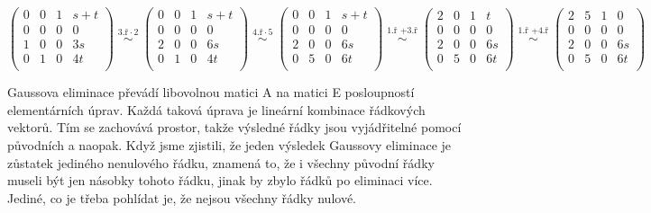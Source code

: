\documentclass[12pt]{article}
\begin{document}
\begin{enumerate}
\begin{enumerate}
    \[
      \left(\begin{array}{ccc|c}
      0 & 0 & 1 & s+t \\
      0 & 0 & 0 & 0 \\ \hline
      1 & 0 & 0 & 3s \\
      0 & 1 & 0 & 4t \\
      \end{array}\right)
      \overset{\text{3.ř} \cdot 2}{\;\sim\;}
      \left(\begin{array}{ccc|c}
      0 & 0 & 1 & s+t \\
      0 & 0 & 0 & 0 \\ \hline
      2 & 0 & 0 & 6s \\
      0 & 1 & 0 & 4t \\
      \end{array}\right)
      \overset{\text{4.ř} \cdot 5}{\;\sim\;}
      \left(\begin{array}{ccc|c}
      0 & 0 & 1 & s+t \\
      0 & 0 & 0 & 0 \\ \hline
      2 & 0 & 0 & 6s \\
      0 & 5 & 0 & 6t \\
      \end{array}\right)
      \overset{\text{1.ř } + \text{3.ř}}{\;\sim\;}
      \left(\begin{array}{ccc|c}
      2 & 0 & 1 & t \\
      0 & 0 & 0 & 0 \\ \hline
      2 & 0 & 0 & 6s \\
      0 & 5 & 0 & 6t \\
      \end{array}\right)
      \overset{\text{1.ř } + \text{4.ř}}{\;\sim\;}
      \left(\begin{array}{ccc|c}
      2 & 5 & 1 & 0 \\
      0 & 0 & 0 & 0 \\ \hline
      2 & 0 & 0 & 6s \\
      0 & 5 & 0 & 6t \\
      \end{array}\right)
    \]

    Gaussova eliminace převádí libovolnou matici A na matici E posloupností elementárních úprav.
    Každá taková úprava je lineární kombinace řádkových vektorů.
    Tím se zachovává prostor, takže výsledné řádky jsou vyjádřitelné pomocí původních a naopak.
    Když jsme zjistili, že jeden výsledek Gaussovy eliminace je zůstatek jediného nenulového řádku,
    znamená to, že i všechny původní řádky museli být jen násobky tohoto řádku,
    jinak by zbylo řádků po eliminaci více. Jediné, co je třeba pohlídat je, že nejsou
    všechny řádky nulové.
    

\end{enumerate}
\end{enumerate}
\end{document}
